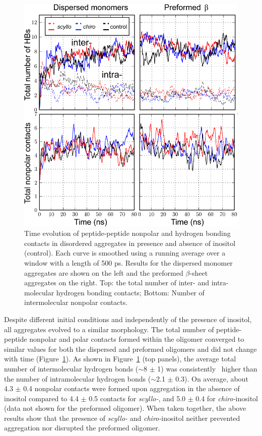 \begin{figure}[htbp]
  \centering
  \includegraphics[width=4.5in]{figures/results1/GA4_paper_figures_submitted-5}
  \caption[Time evolution of peptide-peptide nonpolar and hydrogen bonding contacts in disordered aggregates in presence and absence of inositol (control).]{Time evolution of peptide-peptide nonpolar and hydrogen bonding contacts in disordered aggregates in presence and absence of inositol (control). Each curve is smoothed using a running average over a window with a length of 500 ps. Results for the dispersed monomer aggregates are shown on the left and the preformed $\beta$-sheet aggregates on the right. Top: the total number of inter- and intra-molecular hydrogen bonding contacts; Bottom: Number of intermolecular nonpolar contacts.}
   \label{fig:figure5}
\end{figure}
  
Despite different initial conditions and independently of the presence of inositol, all aggregates evolved to a similar morphology. The total number of peptide-peptide nonpolar and polar contacts formed within the oligomer converged to similar values for both the dispersed and preformed oligomers and did not change with time (Figure~\ref{fig:figure5}). As shown in Figure~\ref{fig:figure5} (top panels), the average total number of intermolecular hydrogen bonds ($\sim$8 $\pm$ 1) was consistently \bbridge\ higher than the number of intramolecular hydrogen bonds ($\sim$2.1 $\pm$ 0.3). On average, about 4.3 $\pm$ 0.4 nonpolar contacts were formed upon aggregation in the absence of inositol compared to 4.4 $\pm$ 0.5 contacts for \textit{scyllo-}, and 5.0 $\pm$ 0.4 for \textit{chiro-}inositol (data not shown for the preformed oligomer). When taken together, the above results show that the presence of \textit{scyllo-} and \textit{chiro-}inositol neither prevented aggregation nor disrupted the preformed oligomer.

